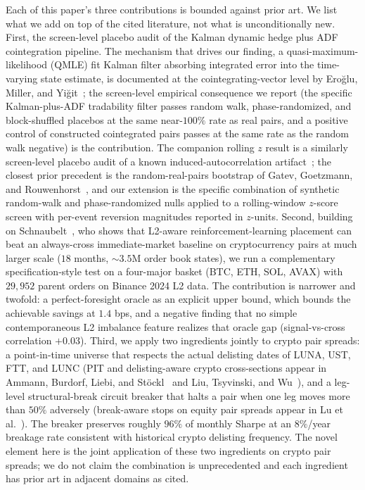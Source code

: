 \documentclass[11pt]{article}
\begin{document}
Each of this paper's three contributions is bounded against prior art. We list what we add
on top of the cited literature, not what is unconditionally new. First, the screen-level
placebo audit of the Kalman dynamic hedge plus ADF cointegration pipeline. The mechanism
that drives our finding, a quasi-maximum-likelihood (QMLE) fit Kalman filter absorbing integrated error into the
time-varying state estimate, is documented at the cointegrating-vector level by Ero\u{g}lu, Miller,
and Yi\u{g}it~\cite{eroglu2022tvc}; the screen-level empirical consequence we report (the
specific Kalman-plus-ADF tradability filter passes random walk, phase-randomized, and
block-shuffled placebos at the same near-$100\%$ rate as real pairs, and a positive
control of constructed cointegrated pairs passes at the same rate as the random walk
negative) is the contribution. The companion rolling $z$ result is a similarly
screen-level placebo audit of a known induced-autocorrelation
artifact~\cite{working1960correlation, cochrane1988random}; the closest prior precedent is
the random-real-pairs bootstrap of Gatev, Goetzmann, and Rouwenhorst~\cite{gatev2006pairs},
and our extension is the specific combination of synthetic random-walk and phase-randomized
nulls applied to a rolling-window $z$-score screen with per-event reversion magnitudes
reported in $z$-units.
Second, building on Schnaubelt~\cite{schnaubelt2022rl}, who shows that L2-aware
reinforcement-learning placement can beat an always-cross immediate-market baseline on
cryptocurrency pairs at much larger scale ($18$ months, $\sim$$3.5$M order book states), we
run a complementary specification-style test on a four-major basket (BTC, ETH, SOL, AVAX)
with $29{,}952$ parent orders on Binance 2024 L2 data. The contribution is narrower and
twofold: a perfect-foresight oracle as an explicit upper bound, which bounds the
achievable savings at $1.4$ bps, and a negative finding that no simple contemporaneous L2
imbalance feature realizes that oracle gap (signal-vs-cross correlation $+0.03$). Third,
we apply two ingredients jointly to crypto pair spreads: a point-in-time universe that
respects the actual delisting dates of LUNA, UST, FTT, and LUNC (PIT and delisting-aware
crypto cross-sections appear in Ammann, Burdorf, Liebi, and
St\"ockl~\cite{ammann2022survivorship} and Liu, Tsyvinski, and Wu~\cite{liu2022common}),
and a leg-level structural-break circuit breaker that halts a pair when one leg moves more
than $50\%$ adversely (break-aware stops on equity pair spreads appear in Lu et
al.~\cite{lu2021structural}). The breaker preserves roughly $96\%$ of monthly Sharpe at an
$8\%$/year breakage rate consistent with historical crypto delisting frequency. The novel
element here is the joint application of these two ingredients on crypto pair spreads; we
do not claim the combination is unprecedented and each ingredient has prior art in adjacent
domains as cited.
\end{document}
